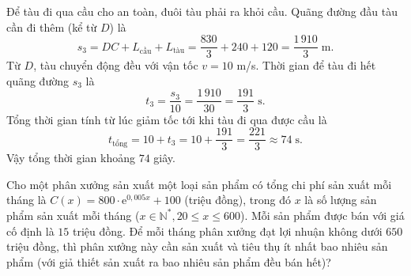 \begin{ex}
{\begin{itemchoice}
			\itemch Để tàu đi qua cầu cho an toàn, đuôi tàu phải ra khỏi cầu. Quãng đường đầu tàu cần đi thêm (kể từ $D$) là
			\[s_3=DC+L_{\text{cầu}}+L_{\text{tàu}}=\dfrac{830}{3} + 240 + 120 = \dfrac{1\,910}{3}\; \text{m}.\]
			Từ $D$, tàu chuyển động đều với vận tốc $v=10$ m/s. Thời gian để tàu đi hết quãng đường $s_3$ là
			\[t_3=\dfrac{s_3}{10}=\dfrac{1\,910}{30}=\dfrac{191}{3} \;\text{s}.\]
			Tổng thời gian tính từ lúc giảm tốc tới khi tàu đi qua được cầu là
			\[t_{\text{tổng}}=10+t_3=10+\dfrac{191}{3}=\dfrac{221}{3} \approx 74\;\text{s}.\]
			Vậy tổng thời gian khoảng $74$ giây. 
		\end{itemchoice}
	}
\end{ex}
\caukq
\begin{ex}%
	Cho một phân xưởng sản xuất một loại sản phẩm có tổng chi phí sản xuất mỗi tháng là $C(x) = 800 \cdot \mathrm{e}^{0{,}005x} + 100$ (triệu đồng), trong đó $x$ là số lượng sản phẩm sản xuất mỗi tháng ($x \in \mathbb{N}^*, 20 \le x \le 600$). Mỗi sản phẩm được bán với giá cố định là $15$ triệu đồng. Để mỗi tháng phân xưởng đạt lợi nhuận không dưới $650$ triệu đồng, thì phân xưởng này cần sản xuất và tiêu thụ ít nhất bao nhiêu sản phẩm (với giả thiết sản xuất ra bao nhiêu sản phẩm đều bán hết)?
	\par{}
\end{ex}
